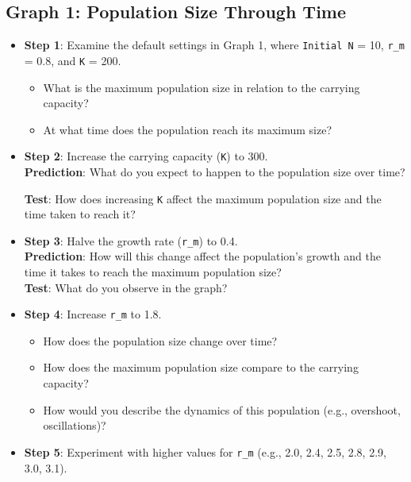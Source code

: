 \documentclass[
  a4paper]{book}
\begin{document}
\subsection{Graph 1: Population Size Through Time}\label{graph-1-population-size-through-time}

\begin{itemize}
\item
  \textbf{Step 1}: Examine the default settings in Graph 1, where \texttt{Initial\ N} = 10, \texttt{r\_m} = 0.8, and \texttt{K} = 200.

  \begin{itemize}
  \item
    What is the maximum population size in relation to the carrying capacity?
  \item
    At what time does the population reach its maximum size?
  \end{itemize}
\item
  \textbf{Step 2}: Increase the carrying capacity (\texttt{K}) to 300.\\
  \textbf{Prediction}: What do you expect to happen to the population size over time?

  \textbf{Test}: How does increasing \texttt{K} affect the maximum population size and the time taken to reach it?
\item
  \textbf{Step 3}: Halve the growth rate (\texttt{r\_m}) to 0.4.\\
  \textbf{Prediction}: How will this change affect the population's growth and the time it takes to reach the maximum population size?\\

  \textbf{Test}: What do you observe in the graph?
\item
  \textbf{Step 4}: Increase \texttt{r\_m} to 1.8.

  \begin{itemize}
  \item
    How does the population size change over time?
  \item
    How does the maximum population size compare to the carrying capacity?
  \item
    How would you describe the dynamics of this population (e.g., overshoot, oscillations)?
  \end{itemize}
\item
  \textbf{Step 5}: Experiment with higher values for \texttt{r\_m} (e.g., 2.0, 2.4, 2.5, 2.8, 2.9, 3.0, 3.1).


\end{itemize}
\end{document}
